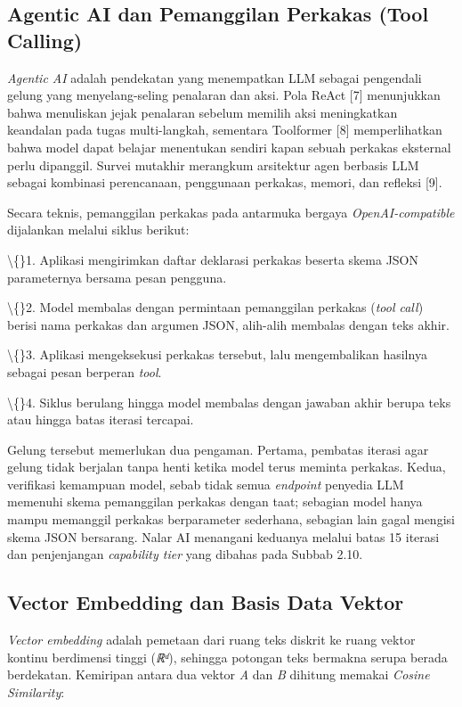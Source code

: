 \documentclass[12pt,a4paper]{article}
\begin{document}
\subsection*{Agentic AI dan Pemanggilan Perkakas (Tool Calling)}
\textit{Agentic AI} adalah pendekatan yang menempatkan LLM sebagai pengendali gelung yang menyelang-seling penalaran dan aksi. Pola ReAct {[}7{]} menunjukkan bahwa menuliskan jejak penalaran sebelum memilih aksi meningkatkan keandalan pada tugas multi-langkah, sementara Toolformer {[}8{]} memperlihatkan bahwa model dapat belajar menentukan sendiri kapan sebuah perkakas eksternal perlu dipanggil. Survei mutakhir merangkum arsitektur agen berbasis LLM sebagai kombinasi perencanaan, penggunaan perkakas, memori, dan refleksi {[}9{]}.

Secara teknis, pemanggilan perkakas pada antarmuka bergaya \textit{OpenAI-compatible} dijalankan melalui siklus berikut:

\textbackslash\{\}1. Aplikasi mengirimkan daftar deklarasi perkakas beserta skema JSON parameternya bersama pesan pengguna.

\textbackslash\{\}2. Model membalas dengan permintaan pemanggilan perkakas (\textit{tool call}) berisi nama perkakas dan argumen JSON, alih-alih membalas dengan teks akhir.

\textbackslash\{\}3. Aplikasi mengeksekusi perkakas tersebut, lalu mengembalikan hasilnya sebagai pesan berperan \textit{tool}.

\textbackslash\{\}4. Siklus berulang hingga model membalas dengan jawaban akhir berupa teks atau hingga batas iterasi tercapai.

Gelung tersebut memerlukan dua pengaman. Pertama, pembatas iterasi agar gelung tidak berjalan tanpa henti ketika model terus meminta perkakas. Kedua, verifikasi kemampuan model, sebab tidak semua \textit{endpoint} penyedia LLM memenuhi skema pemanggilan perkakas dengan taat; sebagian model hanya mampu memanggil perkakas berparameter sederhana, sebagian lain gagal mengisi skema JSON bersarang. Nalar AI menangani keduanya melalui batas 15 iterasi dan penjenjangan \textit{capability tier} yang dibahas pada Subbab 2.10.

\subsection*{Vector Embedding dan Basis Data Vektor}
\textit{Vector embedding} adalah pemetaan dari ruang teks diskrit ke ruang vektor kontinu berdimensi tinggi (\textit{ℝᵈ}), sehingga potongan teks bermakna serupa berada berdekatan. Kemiripan antara dua vektor \textit{A} dan \textit{B} dihitung memakai \textit{Cosine Similarity}:
\end{document}
